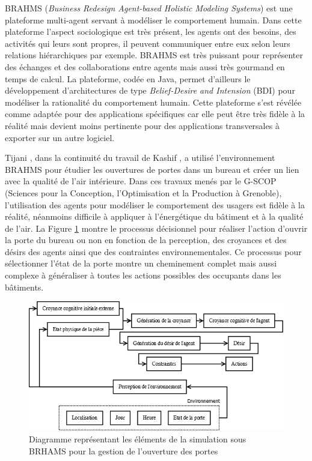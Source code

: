 BRAHMS (\textit{Business Redesign Agent-based Holistic Modeling Systems}) est une plateforme multi-agent servant à modéliser le comportement humain. Dans cette plateforme l'aspect sociologique est très présent, les agents ont des besoins, des activités qui leurs sont propres, il peuvent communiquer entre eux selon leurs relations hiérarchiques par exemple. BRAHMS est très puissant pour représenter des échanges et des collaborations entre agents mais aussi très gourmand en temps de calcul. La plateforme, codée en Java, permet d'ailleurs le développement d'architectures de type \textit{Belief-Desire and Intension} (BDI) pour modéliser la rationalité du comportement humain. Cette plateforme s'est révélée comme adaptée pour des applications spécifiques car elle peut être très fidèle à la réalité mais devient moins pertinente pour des applications transversales à exporter sur un autre logiciel. 

Tijani \cite{Tijani-14}, dans la continuité du travail de Kashif \cite{Kashif-13}, a utilisé l'environnement BRAHMS pour étudier les ouvertures de portes dans un bureau et créer un lien avec la qualité de l'air intérieure. Dans ces travaux menés par le G-SCOP (Sciences pour la Conception, l'Optimisation et la Production à Grenoble), l'utilisation des agents pour modéliser le comportement des usagers est fidèle à la réalité, néanmoins difficile à appliquer à l'énergétique du bâtiment et à la qualité de l'air. La Figure \ref{fig:Diagramme_BRAHMS} montre le processus décisionnel pour réaliser l'action d'ouvrir la porte du bureau ou non en fonction de la perception, des croyances et des désirs des agents ainsi que des contraintes environnementales. Ce processus pour sélectionner l'état de la porte montre un cheminement complet mais aussi complexe à généraliser à toutes les actions possibles des occupants dans les bâtiments. 

\begin{figure}[H]
\centering
\includegraphics[scale=0.4]{Images/diagrammes_SMA/BRAHMS}
\caption{Diagramme représentant les éléments de la simulation sous BRHAMS pour la gestion de l'ouverture des portes}
\label{fig:Diagramme_BRAHMS}
\end{figure}

